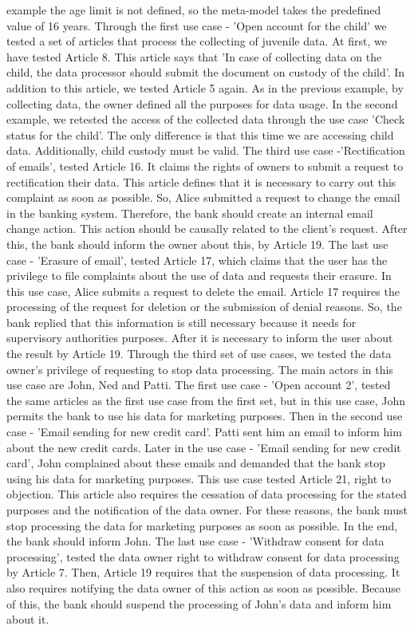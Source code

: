 \documentclass[11pt,english]{article}
\begin{document}
example the age limit is not defined, so the meta-model takes the predefined value of 16 years. Through the first use case - 'Open account for the child' we tested a set of articles that process the collecting of juvenile data. At first, we have tested Article 8. This article says that 'In case of collecting data on the child, the data processor should submit the document on custody of the child'. In addition to this article, we tested Article 5 again. As in the previous example, by collecting data, the owner defined all the purposes for data usage. In the second example, we retested the access of the collected data through the use case 'Check status for the child'. The only difference is that this time we are accessing child data. Additionally, child custody must be valid. The third use case -'Rectification of emails', tested Article 16. It claims the rights of owners to submit a request to rectification their data. This article defines that it is necessary to carry out this complaint as soon as possible. So, Alice submitted a request to change the email in the banking system. Therefore, the bank should create an internal email change action. This action should be causally related to the client's request. After this, the bank should inform the owner about this, by Article 19. The last use case - 'Erasure of email', tested Article 17, which claims that the user has the privilege to file complaints about the use of data and requests their erasure. In this use case, Alice submits a request to delete the email. Article 17 requires the processing of the request for deletion or the submission of denial reasons. So, the bank replied that this information is still necessary because it needs for supervisory authorities purposes. After it is necessary to inform the user about the result by Article 19. \newline Through the third set of use cases, we tested the data owner's privilege of requesting to stop data processing. The main actors in this use case are John, Ned and Patti. The first use case - 'Open account 2', tested the same articles as the first use case from the first set, but in this use case, John permits the bank to use his data for marketing purposes. Then in the second use case - 'Email sending for new credit card'. Patti sent him an email to inform him about the new credit cards. Later in the use case - 'Email sending for new credit card', John complained about these emails and demanded that the bank stop using his data for marketing purposes. This use case tested Article 21, right to objection. This article also requires the cessation of data processing for the stated purposes and the notification of the data owner. For these reasons, the bank must stop processing the data for marketing purposes as soon as possible. In the end, the bank should inform John. The last use case - 'Withdraw consent for data processing', tested the data owner right to withdraw consent for data processing by Article 7. Then, Article 19 requires that the suspension of data processing. It also requires notifying the data owner of this action as soon as possible. Because of this, the bank should suspend the processing of John's data and inform him about it.\newline 
\end{document}
